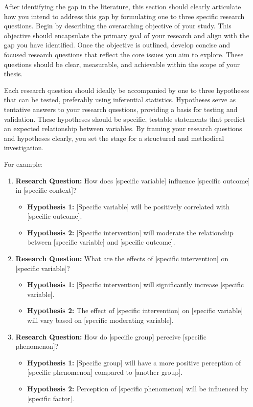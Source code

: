 After identifying the gap in the literature, this section should clearly articulate how you intend to address this gap by formulating one to three specific research questions. Begin by describing the overarching objective of your study. This objective should encapsulate the primary goal of your research and align with the gap you have identified. Once the objective is outlined, develop concise and focused research questions that reflect the core issues you aim to explore. These questions should be clear, measurable, and achievable within the scope of your thesis.

Each research question should ideally be accompanied by one to three hypotheses that can be tested, preferably using inferential statistics. Hypotheses serve as tentative answers to your research questions, providing a basis for testing and validation. These hypotheses should be specific, testable statements that predict an expected relationship between variables. By framing your research questions and hypotheses clearly, you set the stage for a structured and methodical investigation.

For example:
\begin{enumerate}
    \item \textbf{Research Question:} How does [specific variable] influence [specific outcome] in [specific context]?
    \begin{itemize}
        \item \textbf{Hypothesis 1:} [Specific variable] will be positively correlated with [specific outcome].
        \item \textbf{Hypothesis 2:} [Specific intervention] will moderate the relationship between [specific variable] and [specific outcome].
    \end{itemize}
    \item \textbf{Research Question:} What are the effects of [specific intervention] on [specific variable]?
    \begin{itemize}
        \item \textbf{Hypothesis 1:} [Specific intervention] will significantly increase [specific variable].
        \item \textbf{Hypothesis 2:} The effect of [specific intervention] on [specific variable] will vary based on [specific moderating variable].
    \end{itemize}
    \item \textbf{Research Question:} How do [specific group] perceive [specific phenomenon]?
    \begin{itemize}
        \item \textbf{Hypothesis 1:} [Specific group] will have a more positive perception of [specific phenomenon] compared to [another group].
        \item \textbf{Hypothesis 2:} Perception of [specific phenomenon] will be influenced by [specific factor].
    \end{itemize}
\end{enumerate}

